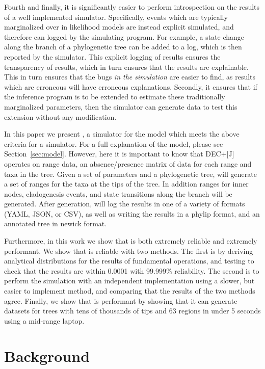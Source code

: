 \documentclass{article}
\begin{document}
Fourth and finally, it is significantly easier to perform introspection on the results of a well implemented simulator.
Specifically, events which are typically marginalized over in likelihood models are instead explicit simulated, and
therefore can logged by the simulating program.
For example, a state change along the branch of a phylogenetic tree can be added to a log, which is then reported by the
simulator.
This explicit logging of results ensures the transparency of results, which in turn ensures that the results are
explainable.
This in turn ensures that the bugs \textit{in the simulation} are easier to find, as results which are erroneous will
have erroneous explanations.
Secondly, it ensures that if the inference program is to be extended to estimate these traditionally marginalized
parameters, then the simulator can generate data to test this extension without any modification.

In this paper we present \bigrig{}, a simulator for the \decj{} model which meets the above criteria for a simulator.
For a full explanation of the \decj{} model, please see Section~\ref{sec:model}.
However, here it is important to know that DEC+[J] operates on range data, an absence/presence matrix of data for each
range and taxa in the tree.
Given a set of \decj{} parameters and a phylogenetic tree, \bigrig{} will generate a set of ranges for the taxa at the
tips of the tree.
In addition ranges for inner nodes, cladogenesis events, and state transitions along the branch will be generated.
After generation, \bigrig{} will log the results in one of a variety of formats (YAML, JSON, or CSV), as well as writing
the results in a phylip format, and an annotated tree in newick format.

Furthermore, in this work we show that \bigrig{} is both extremely reliable and extremely performant.
We show that \bigrig{} is reliable with two methods.
The first is by deriving analytical distributions for the results of fundamental operations, and testing to check that
the results are within 0.0001 with 99.999\% reliability.
The second is to perform the simulation with an independent implementation using a slower, but easier to implement
method, and comparing that the results of the two methods agree.
Finally, we show that \bigrig{} is performant by showing that it can generate datasets for trees with tens of thousands
of tips and 63 regions in under 5  seconds using a mid-range laptop.

\section{Background}
\end{document}
